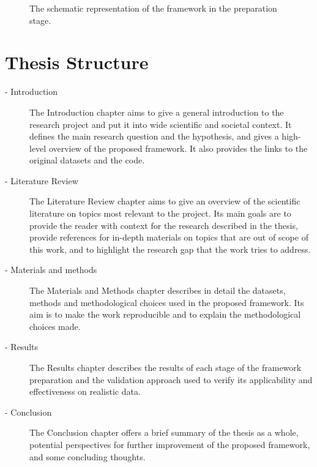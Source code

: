 \begin{figure}
\caption[Schematic representation of the framework: preparation]{\label{fig-framework-prepare}The schematic representation of
the framework in the preparation stage.}
\end{figure}

\section{Thesis Structure}

\begin{description}
    \item[ - Introduction]
The Introduction chapter aims to give a general introduction to the research project and put it into wide scientific and societal context.
It defines the main research question and the hypothesis, and gives a high-level overview of the proposed framework.
It also provides the links to the original datasets and the code.

    \item[ - Literature Review]
The Literature Review chapter aims to give an overview of the scientific literature on topics most relevant to the project.
Its main goals are to provide the reader with context for the research described in the thesis, provide references for in-depth materials on topics that are out of scope of this work, and to highlight the research gap that the work tries to address.

	\item[ - Materials and methods]
The Materials and Methods chapter describes in detail the datasets, methods and methodological choices used in the proposed framework.
Its aim is to make the work reproducible and to explain the methodological choices made.

	\item[ - Results]
The Results chapter describes the results of each stage of the framework preparation and the validation approach used to verify its applicability and effectiveness on realistic data.

    \item[ - Conclusion]
The Conclusion chapter offers a brief summary of the thesis as a whole, potential perspectives for further improvement of the proposed framework, and some concluding thoughts.

\end{description}

